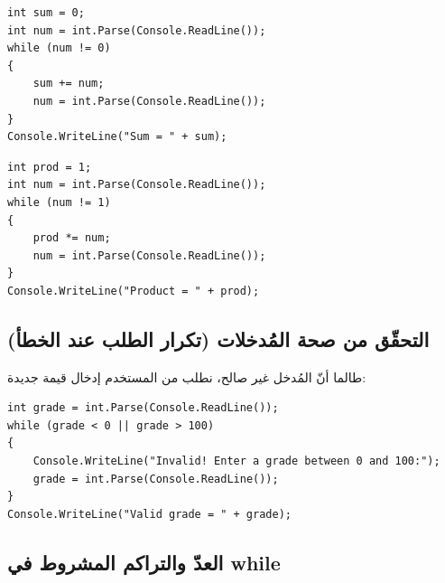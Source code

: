 \documentclass[14pt]{extarticle}
\begin{document}
\begin{boxExample}
\begin{english}
\begin{verbatim}
int sum = 0;
int num = int.Parse(Console.ReadLine());
while (num != 0)
{
    sum += num;
    num = int.Parse(Console.ReadLine());
}
Console.WriteLine("Sum = " + sum);
\end{verbatim}
\end{english}
\end{boxExample}

\filbreak
\begin{boxExample}
\begin{english}
\begin{verbatim}
int prod = 1;
int num = int.Parse(Console.ReadLine());
while (num != 1)
{
    prod *= num;
    num = int.Parse(Console.ReadLine());
}
Console.WriteLine("Product = " + prod);
\end{verbatim}
\end{english}
\end{boxExample}

\filbreak
\subsection{التحقّق من صحة المُدخلات (تكرار الطلب عند الخطأ)}
طالما أنّ المُدخل غير صالح، نطلب من المستخدم إدخال قيمة جديدة:

\begin{boxExample}
\begin{english}
\begin{verbatim}
int grade = int.Parse(Console.ReadLine());
while (grade < 0 || grade > 100)
{
    Console.WriteLine("Invalid! Enter a grade between 0 and 100:");
    grade = int.Parse(Console.ReadLine());
}
Console.WriteLine("Valid grade = " + grade);
\end{verbatim}
\end{english}
\end{boxExample}

\filbreak
\subsection{العدّ والتراكم المشروط في \textenglish{while}}
\end{document}
